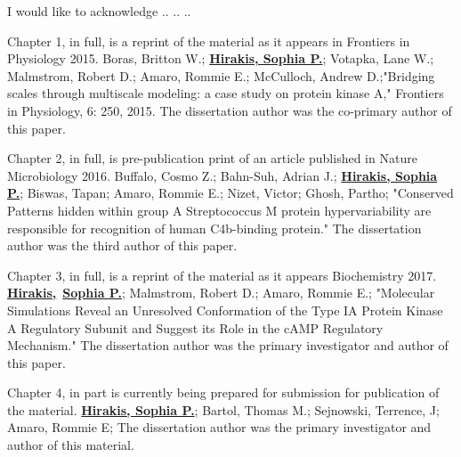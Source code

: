 \documentclass[12pt]{ucsddissertation}
\begin{document}
\begin{acknowledgements}
I would like to acknowledge .. .. .. 

Chapter 1, in full, is a reprint of the material as it appears in Frontiers in Physiology 2015. 
Boras, Britton W.; \textbf{\underline{Hirakis, Sophia P.}}; Votapka, Lane W.; Malmstrom, Robert D.; Amaro, Rommie E.; McCulloch, Andrew D.;"Bridging scales through multiscale modeling: a case study on protein kinase A," Frontiers in Physiology, 6: 250, 2015. 
 The dissertation author was the co-primary author of this paper.

Chapter 2, in full, is pre-publication print of an article published in Nature Microbiology 2016. 
Buffalo, Cosmo Z.; Bahn-Suh, Adrian J.; \textbf{\underline{Hirakis, Sophia P.}}; Biswas, Tapan; Amaro, Rommie E.; Nizet, Victor; Ghosh, Partho; "Conserved Patterns hidden within group A Streptococcus M protein hypervariability are responsible for recognition of human C4b-binding protein." The dissertation author was the third author of this paper.

Chapter 3, in full, is a reprint of the material as it appears Biochemistry 2017. 
\textbf{\underline{Hirakis,}}\ \textbf{\underline{Sophia P.}}; Malmstrom, Robert D.; Amaro, Rommie E.; "Molecular Simulations Reveal an Unresolved Conformation of the Type IA Protein Kinase A Regulatory Subunit and Suggest its Role in the cAMP Regulatory Mechanism." The dissertation author was the primary investigator and author of this paper.

Chapter 4, in part is currently being prepared for submission for
publication of the material. \textbf{\underline{Hirakis, Sophia P.}};  Bartol, Thomas M.; Sejnowski, Terrence, J; Amaro, Rommie E; The dissertation author was the primary investigator and author of this material.




\end{acknowledgements}
\end{document}
